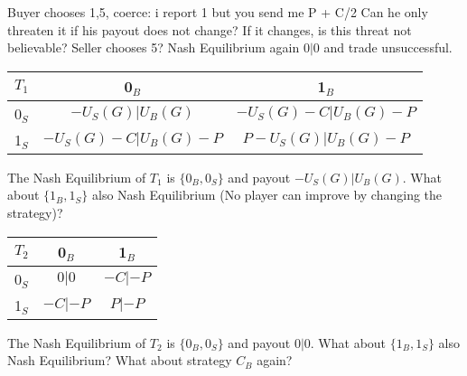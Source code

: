\documentclass{cacthesis}
\begin{document}
Buyer chooses 1,5, coerce: i report 1 but you send me P + C/2\newline
Can he only threaten it if his payout does not change? If it changes, is this threat not believable?\newline
Seller chooses 5?\newline
Nash Equilibrium again $0|0$ and trade unsuccessful. 


\begin{center}
\begin{tabular}{ c||c|c| }
$T_1$& 0$_B$ & 1$_B$   \\
\hline
\hline
0$_S$ & $-U_S(G) | U_B(G)$ & $-U_S(G) - C | U_B(G) - P$ \\
\hline
1$_S$ & $-U_S(G) - C | U_B(G) - P$ & $P - U_S(G) | U_B(G) - P$\\ 
\hline
\end{tabular}
\end{center}

The Nash Equilibrium of $T_1$ is $\{0_B, 0_S\}$ and payout $-U_S(G) | U_B(G)$. What about $\{1_B, 1_S\}$ also Nash Equilibrium (No player can improve by changing the strategy)? 

\begin{center}
\begin{tabular}{ c||c|c| }
$T_2$& 0$_B$ & 1$_B$   \\
\hline
\hline
0$_S$ & $0 | 0$ & $-C|-P$ \\
\hline
1$_S$ & $-C|-P$ & $P | -P$\\ 
\hline
\end{tabular}
\end{center}

The Nash Equilibrium of $T_2$ is $\{0_B, 0_S\}$ and payout $0 | 0$. What about $\{1_B, 1_S\}$ also Nash Equilibrium? What about strategy $C_B$ again?\newline
\end{document}
